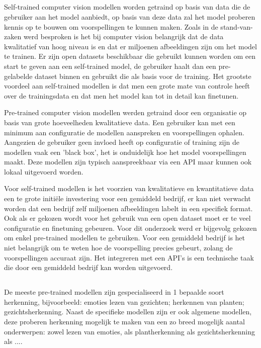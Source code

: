 \subsection{}
\label{sec:Self-trained-versus-pre-trained}
Self-trained computer vision modellen worden getraind op basis van data die de gebruiker aan het model aanbiedt, op basis van deze data zal het model proberen kennis op te bouwen om voorspellingen te kunnen maken. Zoals in de stand-van-zaken werd besproken is het bij computer vision belangrijk dat de data kwalitatief van hoog niveau is en dat er miljoenen afbeeldingen zijn om het model te trainen. Er zijn open datasets beschikbaar die gebruikt kunnen worden om een start te geven aan een self-trained model, de gebruiker haalt dan een pre-gelabelde dataset binnen en gebruikt die als basis voor de training. Het grootste voordeel aan self-trained modellen is dat men een grote mate van controle heeft over de trainingsdata en dat men het model kan tot in detail kan finetunen. 

Pre-trained computer vision modellen werden getraind door een organisatie op basis van grote hoeveelheden kwalitatieve data. Een gebruiker kan met een minimum aan configuratie de modellen aanspreken en voorspellingen ophalen. Aangezien de gebruiker geen invloed heeft op configuratie of training zijn de modellen vaak een 'black box', het is onduidelijk hoe het model voorspellingen maakt. Deze modellen zijn typisch aanspreekbaar via een API maar kunnen ook lokaal uitgevoerd worden.

Voor self-trained modellen is het voorzien van kwalitatieve en kwantitatieve data een te grote initiële investering voor een gemiddeld bedrijf, er kan niet verwacht worden dat een bedrijf zelf miljoenen afbeeldingen labelt in een specifiek format. Ook als er gekozen wordt voor het gebruik van een open dataset moet er te veel configuratie en finetuning gebeuren. Voor dit onderzoek werd er bijgevolg gekozen om enkel pre-trained modellen te gebruiken. Voor een gemiddeld bedrijf is het niet belangrijk om te weten hoe de voorspelling precies gebeurt, zolang de voorspellingen accuraat zijn. Het integreren met een API's is een technische taak die door een gemiddeld bedrijf kan worden uitgevoerd.

\subsection{}
\label{sec:specific-versus-general}
De meeste pre-trained modellen zijn gespecialiseerd in 1 bepaalde soort herkenning, bijvoorbeeld: emoties lezen van gezichten; herkennen van planten; gezichtsherkenning. Naast de specifieke modellen zijn er ook algemene modellen, deze proberen herkenning mogelijk te maken van een zo breed mogelijk aantal onderwerpen: zowel lezen van emoties, als plantherkenning als gezichtsherkenning als .... 


